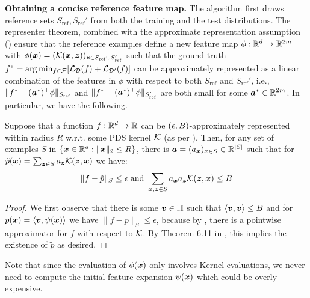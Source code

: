 \documentclass[11pt]{article} %
\numberwithin{equation}{section}
\begin{document}
\noindent\textbf{Obtaining a concise reference feature map.} The algorithm first draws reference sets $S_{\mathrm{ref}}, S_{\mathrm{ref}}'$ from both the training and the test distributions. The representer theorem, combined with the approximate representation assumption () ensure that the reference examples define a new feature map $\phi: \mathbb{R}^d \to \mathbb{R}^{2m}$ with $\phi({\bm{x}}) = (\mathcal{K}({\bm{x}},{\bm{z}}))_{{\bm{z}}\in S_{\mathrm{ref}}\cup S_{\mathrm{ref}}'}$ such that the ground truth $f^* = \arg \min_{f\in{\mathcal{F}}} [{\mathcal{L}}_{{\mathcal{D}}}(f)+ {\mathcal{L}}_{{\mathcal{D}}'}(f)]$ can be approximately represented as a linear combination of the features in $\phi$ with respect to both $S_{\mathrm{ref}}$ and $S_{\mathrm{ref}}'$, i.e., $\|f^*-({{\bm{a}}^*})^\top{\phi}\|_{S_{\mathrm{ref}}}$ and $\|f^*-({{\bm{a}}^*})^{\top}{\phi}\|_{S_{\mathrm{ref}}'}$ are both small for some ${\bm{a}}^*\in \mathbb{R}^{2m}$.  In particular, we have the following.
\begin{proposition}\label{proposition:representer-theorem}
    Suppose that a function $f:\mathbb{R}^d\to \mathbb{R}$ can be $({\epsilon},B)$-approximately represented within radius $R$ w.r.t. some PDS kernel $\mathcal{K}$ (as per ). Then, for any set of examples $S$ in $\{{\bm{x}}\in\mathbb{R}^d : \|{\bm{x}}\|_2\le R\}$, there is ${\bm{a}} = (a_{{\bm{x}}})_{{\bm{x}}\in S} \in \mathbb{R}^{|S|}$ such that for $\tilde{p}({\bm{x}}) = \sum_{{\bm{z}}\in S}a_{{\bm{z}}} \mathcal{K}({\bm{z}},{\bm{x}})$ we have:
    \[ \|f-\tilde{p}\|_S \le \epsilon \text{ and } \sum_{{\bm{x}},{\bm{z}}\in S}a_{{\bm{x}}}a_{{\bm{z}}} \mathcal{K}({\bm{z}},{\bm{x}}) \le B\]
\end{proposition}
\begin{proof}
    We first observe that there is some ${\bm{v}}\in{\mathbb{H}}$ such that $\langle {\bm{v}}, {\bm{v}}\rangle\le B$ and for $p({\bm{x}}) = \langle {\bm{v}}, \psi({\bm{x}})\rangle$ we have $\|f-p\|_S \le \epsilon$, because by , there is a pointwise approximator for $f$ with respect to $\mathcal{K}$. By Theorem 6.11 in \cite{mohri2018foundations}, this implies the existence of $\tilde{p}$ as desired.
\end{proof}
Note that since the evaluation of $\phi({\bm{x}})$ only involves Kernel evaluations, we never need to compute the initial feature expansion $\psi({\bm{x}})$ which could be overly expensive.
\end{document}
